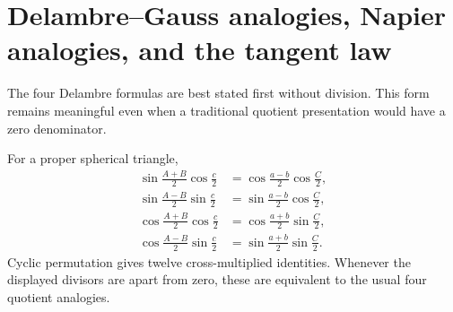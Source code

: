 \section{Delambre--Gauss analogies, Napier analogies, and the tangent law}
\label{sec:analogies}

The four Delambre formulas are best stated first without division.  This form
remains meaningful even when a traditional quotient presentation would have a
zero denominator.

\begin{theorem}
\label{thm:delambre}
For a proper spherical triangle,
\begin{align}
 \sin\frac{A+B}{2}\cos\frac c2
 &=\cos\frac{a-b}{2}\cos\frac C2,                           \tag{7.1}\\
 \sin\frac{A-B}{2}\sin\frac c2
 &=\sin\frac{a-b}{2}\cos\frac C2,                           \tag{7.2}\\
 \cos\frac{A+B}{2}\cos\frac c2
 &=\cos\frac{a+b}{2}\sin\frac C2,                           \tag{7.3}\\
 \cos\frac{A-B}{2}\sin\frac c2
 &=\sin\frac{a+b}{2}\sin\frac C2.                           \tag{7.4}
\end{align}
Cyclic permutation gives twelve cross-multiplied identities.  Whenever the
displayed divisors are apart from zero, these are equivalent to the usual
four quotient analogies.
\end{theorem}

